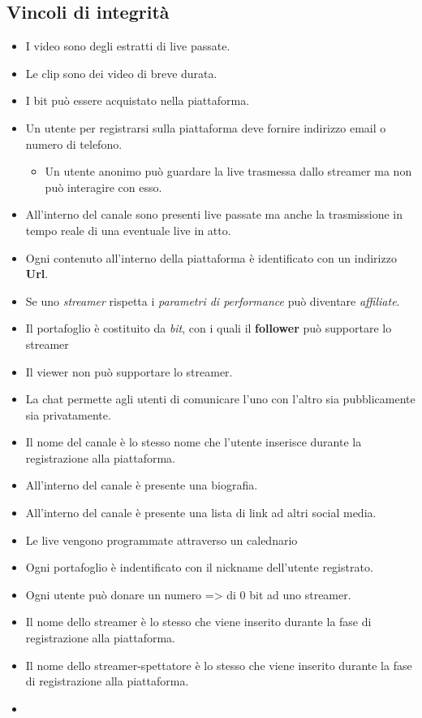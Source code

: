 \subsection{Vincoli di integrità}
\begin{itemize}
    \item I video sono degli estratti di live passate.
    \item Le clip sono dei video di breve durata.
    \item I bit può essere acquistato nella piattaforma.
    \item Un utente per registrarsi sulla piattaforma deve fornire indirizzo email o numero di telefono.
    \begin{itemize}
        \item Un utente anonimo può guardare la live trasmessa dallo streamer ma non può interagire con esso. 
    \end{itemize}
    \item All'interno del canale sono presenti live passate ma anche la trasmissione in tempo reale di una eventuale live in atto.
    \item Ogni contenuto all'interno della piattaforma è identificato con un indirizzo \textbf{Url}.
        \item Se uno \textit{streamer} rispetta i \textit{parametri di performance} può diventare \textit{affiliate}.
        \item Il portafoglio è costituito da \textit{bit}, con i quali il \textbf{follower} può supportare lo streamer
        \item Il viewer non può supportare lo streamer.
        \item La chat permette agli utenti di comunicare l'uno con l'altro sia pubblicamente sia privatamente.
        \item Il nome del canale è lo stesso nome che l'utente inserisce durante la registrazione alla piattaforma.
        \item All'interno del canale è presente una biografia. 
        \item All'interno del canale è presente una lista di link ad altri social media.
        \item Le live vengono programmate attraverso un calednario
        \item Ogni portafoglio è indentificato con il nickname dell'utente registrato. 
        \item Ogni utente può donare un numero => di 0 bit ad uno streamer. 
        \item Il nome dello streamer è lo stesso che viene inserito durante la fase di registrazione alla piattaforma.
        \item Il nome dello streamer-spettatore è lo stesso che viene inserito durante la fase di registrazione alla piattaforma.
        \item 
\end{itemize}